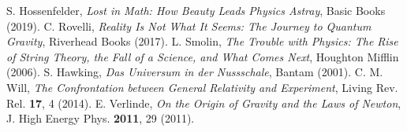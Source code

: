 \documentclass[12pt,a4paper]{article}
\begin{document}
\begin{thebibliography}{99}
		 S. Hossenfelder, \textit{Lost in Math: How Beauty Leads Physics Astray}, Basic Books (2019).
		 C. Rovelli, \textit{Reality Is Not What It Seems: The Journey to Quantum Gravity}, Riverhead Books (2017).
		 L. Smolin, \textit{The Trouble with Physics: The Rise of String Theory, the Fall of a Science, and What Comes Next}, Houghton Mifflin (2006).
		 S. Hawking, \textit{Das Universum in der Nussschale}, Bantam (2001).
		 C. M. Will, \textit{The Confrontation between General Relativity and Experiment}, Living Rev. Rel. \textbf{17}, 4 (2014).
		 E. Verlinde, \textit{On the Origin of Gravity and the Laws of Newton}, J. High Energy Phys. \textbf{2011}, 29 (2011).
	\end{thebibliography}
	
\end{document}
